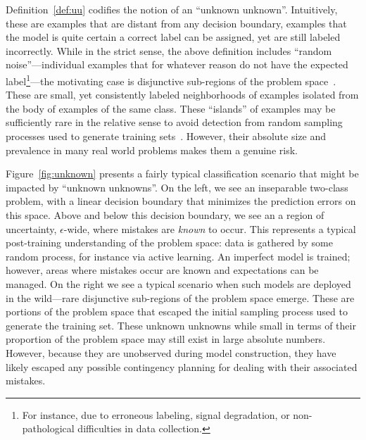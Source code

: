 Definition~\ref{def:uu} codifies the notion of an ``unknown unknown''. Intuitively, these are examples that are distant from any decision boundary, examples that the model is quite certain a correct label can be assigned, yet are still labeled incorrectly.  While in the strict sense, the above definition includes ``random noise''---individual examples that for whatever reason do not have the expected label\footnote{For instance,  due to erroneous labeling, signal degradation, or non-pathological difficulties in data collection.}---the motivating case is disjunctive sub-regions of the problem space~\cite{weiss10disjunct}. These are small, yet consistently labeled neighborhoods of examples isolated from the body of examples of the same class. These ``islands'' of examples may be sufficiently rare in the relative sense to avoid detection from random sampling processes used to generate training sets~\cite{attenberg:2010inactive}. However, their absolute size and prevalence in many real world problems makes them a genuine risk.

Figure~\ref{fig:unknown} presents a fairly typical classification
scenario that might be impacted by ``unknown unknowns''. On the left,
we see an inseparable two-class problem, with a linear decision
boundary that minimizes the prediction errors on this space. Above and
below this decision boundary, we see an a region of uncertainty, $\epsilon$-wide,
where mistakes are \emph{known} to occur. This
represents a typical post-training understanding of the problem space: 
data is gathered by some random process, for instance via active
learning. An imperfect model is trained; however, areas where mistakes
occur are known and expectations can be managed. On the right we see
a typical scenario when such models are deployed in the wild---rare
disjunctive sub-regions of the problem space emerge.  These are portions of the
problem space that escaped the initial sampling process used to generate
the training set. These unknown unknowns while small in terms of their
proportion of the problem space may still exist in large absolute
numbers.  However, because they are unobserved during model
construction, they have likely escaped any possible contingency
planning for dealing with their associated mistakes.

